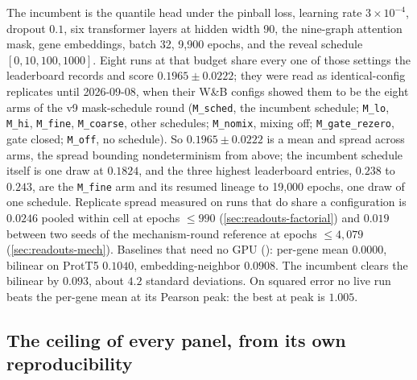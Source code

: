 The incumbent is the quantile head under the pinball loss, learning rate $3 \times 10^{-4}$,
dropout $0.1$, six transformer layers at hidden width 90, the nine-graph attention mask,
 gene embeddings, batch 32, 9{,}900 epochs, and the reveal schedule
$[0, 10, 100, 1000]$. Eight runs at that budget share every one of those settings the
leaderboard records and score $\mathbf{0.1965 \pm 0.0222}$; they were read as
identical-config replicates until 2026-09-08, when their W\&B configs showed them to be the
eight arms of the v9 mask-schedule round (\texttt{M\_sched}, the incumbent schedule;
\texttt{M\_lo}, \texttt{M\_hi}, \texttt{M\_fine}, \texttt{M\_coarse}, other schedules;
\texttt{M\_nomix}, mixing off; \texttt{M\_gate\_rezero}, gate closed; \texttt{M\_off}, no
schedule). So $0.1965 \pm 0.0222$ is a mean and spread across arms, the spread bounding
nondeterminism from above; the incumbent schedule itself is one draw at $0.1824$, and the
three highest leaderboard entries, $0.238$ to $0.243$, are the \texttt{M\_fine} arm and its
resumed lineage to 19{,}000 epochs, one draw of one schedule. Replicate spread measured on
runs that do share a configuration is $0.0246$ pooled within cell at epochs $\le 990$
(\cref{sec:readouts-factorial}) and $0.019$ between two seeds of the mechanism-round
reference at epochs $\le 4{,}079$ (\cref{sec:readouts-mech}). Baselines that need no GPU
(): per-gene mean $0.0000$, bilinear on ProtT5 $0.1040$,
embedding-neighbor $0.0908$. The incumbent clears the bilinear by $0.093$, about $4.2$
standard deviations. On squared error no live run beats the per-gene mean at its Pearson
peak: the best  at peak is $1.005$.

\subsection{The ceiling of every panel, from its own reproducibility}
\label{sec:findings-ceilings}

